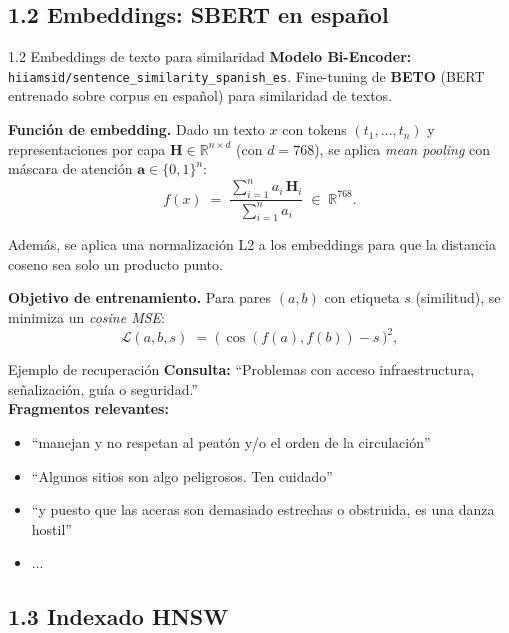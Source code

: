 \documentclass[10pt,aspectratio=169]{beamer}
\newcommand{\R}{\mathbb{R}}
\begin{document}
\subsection{1.2 Embeddings: SBERT en español}

\begin{frame}{1.2 Embeddings de texto para similaridad}
	\textbf{Modelo Bi-Encoder:} \texttt{hiiamsid/sentence\_similarity\_spanish\_es}.
	Fine-tuning de \textbf{BETO} (BERT entrenado sobre corpus en español) para similaridad de textos.

	\medskip
	\textbf{Función de embedding.}
	Dado un texto $x$ con tokens $(t_1,\dots,t_n)$ y representaciones por
	capa $\mathbf{H} \in \R^{n \times d}$ (con $d=768$), se aplica
	\emph{mean pooling} con máscara de atención $\mathbf{a}\in\{0,1\}^n$:
	\[
		f(x) \;=\; \frac{\sum_{i=1}^{n} a_i\, \mathbf{H}_i}{\sum_{i=1}^{n} a_i}
		\;\in\; \R^{768}.
	\]

	Además, se aplica una normalización L2 a los embeddings para que la distancia coseno sea solo un producto punto.

	\textbf{Objetivo de entrenamiento.}
	Para pares $(a,b)$ con etiqueta $s$ (similitud), se minimiza un
	\emph{cosine MSE}:
	\[
		\mathcal{L}(a,b,s) \;=\; \bigl(\,\cos(f(a), f(b)) - s\,\bigr)^2,
	\]
\end{frame}

\begin{frame}{Ejemplo de recuperación}
	\textbf{Consulta:} ``Problemas con acceso infraestructura, señalización, guía o seguridad.'' \\ \vspace{0.1cm}
	\textbf{Fragmentos relevantes:}
	\begin{itemize}
		\item ``manejan y no respetan al peatón y/o el orden de la circulación''
		\item ``Algunos sitios son algo peligrosos. Ten cuidado''
		\item ``y puesto que las aceras son demasiado estrechas o obstruida, es una danza hostil''
		\item ...
	\end{itemize}
\end{frame}

\subsection{1.3 Indexado HNSW}
\end{document}
